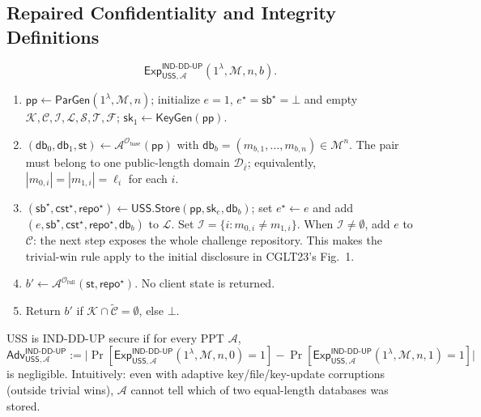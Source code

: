 \subsection{Repaired Confidentiality and Integrity Definitions}

\begin{definition}
\label{def:ind-dd-up}
\par{}
\[
\mathsf{Exp}^{\mathsf{IND\text{-}DD\text{-}UP}}_{\mathsf{USS},\mathcal{A}}(1^\lambda,\mathcal{M},n,b).
\]
\begin{enumerate}
  \item $\mathsf{pp}\gets\mathsf{ParGen}(1^\lambda,\mathcal{M},n)$; initialize $e=1$, $e^\star=\mathsf{sb}^\star=\bot$ and empty $\mathcal{K},\mathcal{C},\mathcal{I},\mathcal{L},\mathcal{S},\mathcal{T},\mathcal{F}$; $\mathsf{sk}_1\gets\mathsf{KeyGen}(\mathsf{pp})$.
  \item $(\mathsf{db}_0,\mathsf{db}_1,\mathsf{st})\gets\mathcal{A}^{\mathcal O_{\mathrm{base}}}(\mathsf{pp})$
        with $\mathsf{db}_b=(m_{b,1},\dots,m_{b,n})\in\mathcal M^n$. The pair must belong to one public-length domain $\mathcal D_{\bar\ell}$; equivalently, $|m_{0,i}|=|m_{1,i}|=\ell_i$ for each $i$.
  \item $(\mathsf{sb}^\star,\mathsf{cst}^\star,\mathsf{repo}^\star)\gets\mathsf{USS.Store}(\mathsf{pp},\mathsf{sk}_e,\mathsf{db}_b)$; set $e^\star\leftarrow e$ and add $(e,\mathsf{sb}^\star,\mathsf{cst}^\star,\mathsf{repo}^\star,\mathsf{db}_b)$ to $\mathcal{L}$. Set $\mathcal I=\{i:m_{0,i}\neq m_{1,i}\}$. When $\mathcal I\neq\emptyset$, add $e$ to $\mathcal C$: the next step exposes the whole challenge repository. This makes the trivial-win rule apply to the initial disclosure in CGLT23's Fig.~1.
  \item $b'\gets\mathcal{A}^{\mathcal O_{\mathrm{full}}}(\mathsf{st},\mathsf{repo}^\star)$. No client state is returned.
  \item Return $b'$ if $\mathcal{K}\cap\tilde{\mathcal{C}}=\emptyset$, else $\bot$.
\end{enumerate}
USS is IND-DD-UP secure if for every PPT $\mathcal{A}$,
\[
\mathsf{Adv}^{\mathsf{IND\text{-}DD\text{-}UP}}_{\mathsf{USS},\mathcal{A}}
:=\bigl|\Pr[\mathsf{Exp}^{\mathsf{IND\text{-}DD\text{-}UP}}_{\mathsf{USS},\mathcal{A}}(1^\lambda,\mathcal{M},n,0)=1]
-\Pr[\mathsf{Exp}^{\mathsf{IND\text{-}DD\text{-}UP}}_{\mathsf{USS},\mathcal{A}}(1^\lambda,\mathcal{M},n,1)=1]\bigr|
\]
is negligible.
Intuitively: even with adaptive key/file/key-update corruptions (outside trivial wins), $\mathcal{A}$ cannot tell which of two equal-length databases was stored.
\end{definition}

